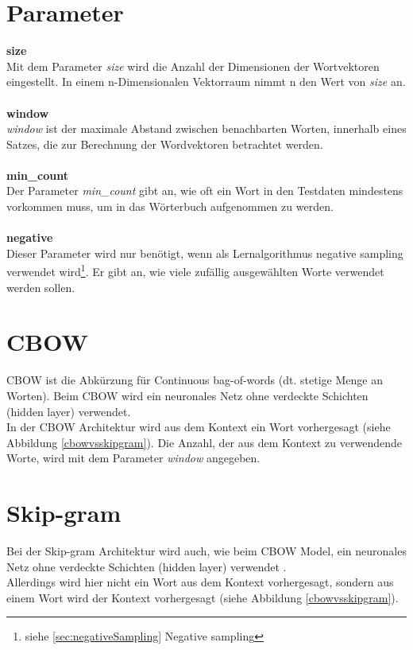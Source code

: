 \documentclass[12pt,a4paper]{report}
\begin{document}
	\section{Parameter}
	\label{sec:Parameter}
	\textbf{size}
	\vspace{1em}\\
	Mit dem Parameter \textit{size} wird die Anzahl der Dimensionen der Wortvektoren eingestellt. In einem n-Dimensionalen Vektorraum nimmt n den Wert von \textit{size} an.\\	
	\vspace{1em}\\
	\textbf{window}
	\vspace{1em}\\
	\textit{window} ist der maximale Abstand zwischen benachbarten Worten, innerhalb eines Satzes, die zur Berechnung der Wordvektoren betrachtet werden.\\
	\vspace{1em}\\
	\textbf{min\_count}
	\vspace{1em}\\
	Der Parameter \textit{min\_count} gibt an, wie oft ein Wort in den Testdaten mindestens vorkommen muss, um in das Wörterbuch aufgenommen zu werden.\\
	\vspace{1em}\\
	\textbf{negative}
	\vspace{1em}\\
	Dieser Parameter wird nur benötigt, wenn als Lernalgorithmus negative sampling verwendet wird\footnote{siehe \ref{sec:negativeSampling} Negative sampling}. Er gibt an, wie viele zufällig ausgewählten Worte verwendet werden sollen.
	
	\section{CBOW}
	CBOW ist die Abkürzung für Continuous bag-of-words (dt. stetige Menge an Worten). Beim CBOW wird ein neuronales Netz ohne verdeckte Schichten (hidden layer) verwendet\cite{DBLP:journals/corr/abs-1301-3781}.\\
	In der CBOW Architektur wird aus dem Kontext ein Wort vorhergesagt (siehe Abbildung \ref{cbowvsskipgram}). Die Anzahl, der aus dem Kontext zu verwendende Worte, wird mit dem Parameter \textit{window} angegeben.
	
	\section{Skip-gram}
	Bei der Skip-gram Architektur wird auch, wie beim CBOW Model, ein neuronales Netz ohne verdeckte Schichten (hidden layer) verwendet \citep{DBLP:journals/corr/abs-1301-3781}.\\
	Allerdings wird hier nicht ein Wort aus dem Kontext vorhergesagt, sondern aus einem Wort wird der Kontext vorhergesagt (siehe Abbildung \ref{cbowvsskipgram}).\\
	
\end{document}
